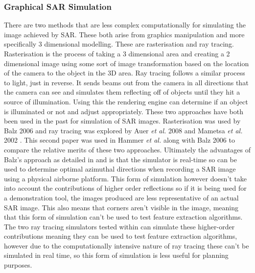 \subsubsection{Graphical SAR Simulation}
There are two methods that are less complex computationally for simulating the image achieved by SAR. These both arise from graphics manipulation and more specifically 3 dimensional modelling. These are rasterisation and ray tracing. Rasterisation is the process of taking a 3 dimensional area and creating a 2 dimensional image using some sort of image transformation based on the location of the camera to the object in the 3D area. Ray tracing follows a similar process to light, just in reverse. It sends beams out from the camera in all directions that the camera can see and simulates them reflecting off of objects until they hit a source of illumination. Using this the rendering engine can determine if an object is illuminated or not and adjust appropriately. These two approaches have both been used in the past for simulation of SAR images. Rasterisation was used by Balz 2006 \cite{balzRealtimeSARSimulation2006} and ray tracing was explored by Auer \textit{et al.} 2008 \cite{auerRayTracingSimulating2008} and Mametsa \textit{et al.} 2002 \cite{mametsaImagingRadarSimulation2002}. This second paper was used in Hammer \textit{et al.} \cite{hammerComparisonSARSimulation2008} along with Balz 2006 to compare the relative merits of these two approaches. Ultimately the advantages of Balz's approach as detailed in \cite{balzImprovedRealTimeSAR2006} and \cite{balzRealtimeSARSimulation2006} is that the simulator is real-time so can be used to determine optimal azimuthal directions when recording a SAR image using a physical airborne platform. This form of simulation however doesn't take into account the contributions of higher order reflections so if it is being used for a demonstration tool, the images produced are less representative of an actual SAR image. This also means that corners aren't visible in the image, meaning that this form of simulation can't be used to test feature extraction algorithms. The two ray tracing simulators tested within \cite{hammerComparisonSARSimulation2008} can simulate these higher-order contributions meaning they can be used to test feature extraction algorithms, however due to the computationally intensive nature of ray tracing these can't be simulated in real time, so this form of simulation is less useful for planning purposes. \par
